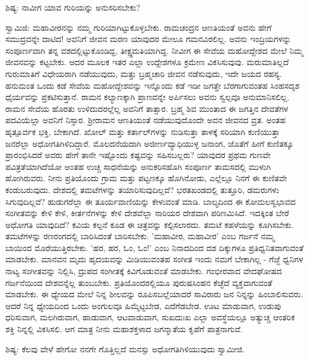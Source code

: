 ಶಿಷ್ಯ: ನಾವೀಗ ಯಾವ ಗುರಿಯನ್ನು ಅನುಸರಿಸಬೇಕು?

ಸ್ವಾಮಿಜಿ: ಮಹಾವೀರನನ್ನು ನಮ್ಮ ಗುರಿಯಾಗಿಟ್ಟುಕೊಳ್ಳಬೇಕು. ರಾಮಚಂದ್ರನ ಆಣತಿಯಂತೆ ಅವನು ಹೇಗೆ ಸಮುದ್ರವನ್ನೇ ದಾಟಿದ! ಅವನಿಗೆ ಜೀವನ ಮರಣ ಯಾವುದರ ಮೇಲೂ ಗಮನವಿರಲಿಲ್ಲ. ಅವನು ಇಂದ್ರಿಯಗಳನ್ನು ಸಂಪೂರ್ಣವಾಗಿ ತನ್ನ ವಶದಲ್ಲಿಟ್ಟುಕೊಂಡಿದ್ದ, ತೀಕ್ಷ್ಣಮತಿಯಾಗಿದ್ದ. ನೀವೀಗ ಈ ಸೇವೆಯ ಮಹೋದ್ದೇಶದ ಮೇಲೆ ನಿಮ್ಮ ಜೀವನವನ್ನು ಕಟ್ಟಬೇಕು. ಅದರ ಮೂಲಕ ಇತರ ಎಲ್ಲಾ ಉದ್ದೇಶಗಳೂ ಕ್ರಮೇಣ ವಿಕಸಿಸುವುವು. ಮರುಮಾತಿಲ್ಲದೆ ಗುರುಮಾತಿಗೆ ವಿಧೇಯರಾಗಿ ನಡೆಯುವುದು, ಮತ್ತು ಬ್ರಹ್ಮಚಾರಿ ಜೀವನ ನಡೆಸುವುದು, ಇದೇ ಜಯದ ರಹಸ್ಯ. ಹನುಮಂತ ಒಂದು ಕಡೆ ಸೇವೆಯ ಮಹೋದ್ದೇಶವನ್ನು ಇನ್ನೊಂದು ಕಡೆ ಇಡೀ ಜಗತ್ತೇ ಬೆರಗಾಗುವಂತಹ ಸಿಂಹಸದೃಶ ಧೈರ್ಯವನ್ನು ಪ್ರಕಟಿಸುತ್ತಾನೆ. ರಾಮನ ಕಲ್ಯಾಣಕ್ಕಾಗಿ ಪ್ರಾಣವನ್ನೇ ಅರ್ಪಿಸಲು ಅವನು ಸ್ವಲ್ಪವೂ ಅನುಮಾನಿಸಲಿಲ್ಲ. ರಾಮನ ಸೇವೆಯ ಹೊರತು ಉಳಿದುದರಲ್ಲೆಲ್ಲ ಅವನಿಗೆ ತಾತ್ಸಾರ. ಬ್ರಹ್ಮ ಶಿವ ಮುಂತಾದ ಈ ಜಗತ್ತಿನ ದೇವತೆಗಳ ಪದವಿಯೆಲ್ಲಾ ಅವನಿಗೆ ನಿಸ್ಸಾರ. ಶ‍್ರೀರಾಮನ ಆಣತಿಯಂತೆ ನಡೆಯುವುದೊಂದೇ ಅವನ ಜೀವನದ ವ್ರತ. ಅಂತಹ ಹೃತ್ಪೂರ್ವಕ ಭಕ್ತಿ, ಬೇಕಾಗಿದೆ. ಖೋಲ್ ಮತ್ತು ಕರ್ತಾಲ್‌ಗಳನ್ನು ನುಡಿಸುತ್ತಾ ತಾಳಕ್ಕೆ ಸರಿಯಾಗಿ ಕುಣಿಯುತ್ತಾ ಜನರೆಲ್ಲಾ ಅಧೋಗತಿಗಿಳಿದಿದ್ದಾರೆ. ಮೊಲದನೆಯದಾಗಿ ಅಜೀರ್ಣವ್ಯಾಧಿಯುಳ್ಳ ಜನಾಂಗ, ಜೊತೆಗೆ ಹೀಗೆ ಕುಣಿತಕ್ಕೂ ಪ್ರಾರಂಭಿಸಿದರೆ ಅವರು ಹೇಗೆ ತಾನೇ ಇಷ್ಟೊಂದು ಕಷ್ಟವನ್ನು ಸಹಿಸಬಲ್ಲರು? ಯಾವುದರ ಪ್ರಥಮ ಗುಣವೇ ಪವಿತ್ರತೆಯಾಗಿದೆಯೋ ಅಂತಹ ಉಚ್ಚ ಸಾಧನೆಯನ್ನು ಅನುಕರಿಸಹೊಗಿ ಸಂಪೂರ್ಣ ತಾಮಸದಲ್ಲಿ ಮುಳುಗಿ ಹೋಗಿರುವರು. ನೀನು ಪ್ರತಿಯೊಂದು ಗ್ರಾಮ ಮತ್ತು ಪಟ್ಟಣಕ್ಕೂ ಹೊಗಿನೋಡು, ಎಲ್ಲೆಲ್ಲೂ ನಿನಗೆ ಈ ಕುಣಿತವೇ ಕಂಡುಬರುವುದು. ದೇಶದಲ್ಲಿ ತಮಟೆಗಳನ್ನು ತಯಾರಿಸುವುದಿಲ್ಲವೆ? ಭರತಖಂಡದಲ್ಲಿ ತುತ್ತೂರಿ, ಡಮರುಗಳು ಸಿಗುವುದಿಲ್ಲವೆ? ಹುಡುಗರೆಲ್ಲಾ ಈ ತೂರ್ಯವಾಣಿಯನ್ನು ಕೇಳುವಂತೆ ಮಾಡಿ. ಬಾಲ್ಯದಿಂದ ಈ ಕೋಮಲಸ್ವಭಾವದ ಸಂಗೀತವನ್ನು ಕೇಳಿ ಕೇಳಿ, ಕೀರ್ತನೆಗಳನ್ನು ಕೇಳಿ ದೇಶವೆಲ್ಲಾ ನಾರಿಯರ ದೇಶವಾಗಿ ಪರಿಣಮಿಸಿದೆ. ಇದಕ್ಕಿಂತ ಬೇರೆ ಅಧೋಗತಿ ಯಾವುದಿದೆ? ಕವಿಯ ಕಲ್ಪನೆ ಕೂಡ ಈ ಚಿತ್ರವನ್ನು ಕಲ್ಪಿಸಲಾರದು. ತಮಟೆ ಕಹಳೆಯನ್ನು ಕೂಗಿಸಬೇಕು. ತಮಟೆಗಳನ್ನು ರಣರಂಗದಲ್ಲಿ ಬಾರಿಸಿದಂತೆ ಬಾರಿಸಬೇಕು. 'ಮಹಾವೀರ, ಮಹಾವೀರ' ಎಂಬ ಗರ್ಜನೆ ನಮ್ಮ ಬಾಯಿಂದ ಮೊರೆಯುತ್ತಿರಬೇಕು. 'ಹರ, ಹರ, ಓಂ, ಓಂ!' ಎಂಬ ನಿನಾದದಿಂದ ದಶ ದಿಕ್ಕುಗಳೂ ಪ್ರತಿಧ್ವನಿತವಾಗುವಂತೆ ಮಾಡಬೇಕು. ಮಾನವನ ಮೃದು ಹೃದಯವನ್ನು ಮಿಡಿಯುವಂತಹ ಸಂಗೀತ ಇಂದು ನಮಗೆ ಬೇಕಾಗಿಲ್ಲ - ಗೆಜ್ಜೆ ಧ್ವನಿಗಳ ನಾಟ್ಯ ಸಂಗೀತವನ್ನು ನಿಲ್ಲಿಸಿ, ದ್ರುಪದ ಸಂಗೀತಕ್ಕೆ ಕಿವಿಗೊಡುವಂತೆ ಮಾಡಬೇಕು. ಗಂಭೀರವಾದ ವೇದಘೋಷದ ಗರ್ಜನೆಯಿಂದ ದೇಶವನ್ನೆಲ್ಲ ತುಂಬಬೇಕು. ಪ್ರತಿಯೊಂದರಲ್ಲಿಯೂ ಪುರುಷಸಿಂಹನ ಕೆಚ್ಛೆದೆ ವ್ಯಕ್ತವಾಗುವಂತೆ ಮಾಡಬೇಕು. ಈ ಧ್ಯೇಯದ ಮೇಲೆ ನಿನ್ನ ಶೀಲವನ್ನು ರೂಪಿಸಬಲ್ಲೆಯಾದರೆ ಸಾವಿರಾರು ಜನ ನಿನ್ನನ್ನು ಹಿಂಬಾಲಿಸುವರು. ಆದರೆ ನಿನ್ನ ಧ್ಯೇಯದಿಂದ ಒಂದು ಅಂಗುಲವೂ ಹಿಮ್ಮೆಟ್ಟಬೇಡ, ಎದೆಗೆಡಬೇಡ. ಊಟ ಮಾಡುವಾಗ, ಉಡುಪು ಧರಿಸುವಾಗ, ಮಲಗಿರುವಾಗ, ಹಾಡುವಾಗ, ಆಟವಾಡುವಾಗ, ಸುಖದುಃಖ ಎಲ್ಲಾ ಅವಸ್ಥೆಯಲ್ಲೂ ಅತ್ಯುಚ್ಚ ಆಂತರಿಕ ಶಕ್ತಿ ನಿನ್ನಲ್ಲಿ ವಿಕಸಿಸಲಿ. ಆಗ ಮಾತ್ರ ನೀನು ಮಹಾಶಕ್ತಳಾದ ಜಗನ್ಮಾತೆಯ ಕೃಪೆಗೆ ಪಾತ್ರನಾಗುವೆ.

ಶಿಷ್ಯ: ಕೆಲವು ವೇಳೆ ಹೇಗೋ ನನಗೇ ಗೊತ್ತಿಲ್ಲದೆ ಮನಸ್ಸು ಅಧೋಗತಿಗಿಳಿಯುವುದು ಸ್ವಾಮೀಜಿ.

